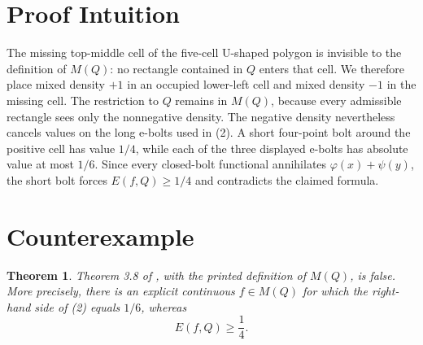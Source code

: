 \documentclass[11pt]{article}
\newtheorem{theorem}{Theorem}
\begin{document}
\section{Proof Intuition}

The missing top-middle cell of the five-cell U-shaped polygon is invisible
to the definition of $M(Q)$: no rectangle contained in $Q$ enters that
cell. We therefore place mixed density $+1$ in an occupied lower-left cell
and mixed density $-1$ in the missing cell. The restriction to $Q$ remains
in $M(Q)$, because every admissible rectangle sees only the nonnegative
density. The negative density nevertheless cancels values on the long
e-bolts used in (2). A short four-point bolt around the positive cell has
value $1/4$, while each of the three displayed e-bolts has absolute value
at most $1/6$. Since every closed-bolt functional annihilates
$\varphi(x)+\psi(y)$, the short bolt forces $E(f,Q)\geq1/4$ and contradicts
the claimed formula.

\section{Counterexample}

\begin{theorem}\label{thm:main}
Theorem 3.8 of \cite{Notes}, with the printed definition of $M(Q)$, is
false. More precisely, there is an explicit continuous $f\in M(Q)$ for
which the right-hand side of \emph{(2)} equals $1/6$, whereas
\[
 E(f,Q)\geq\frac14.
\]
\end{theorem}
\end{document}
